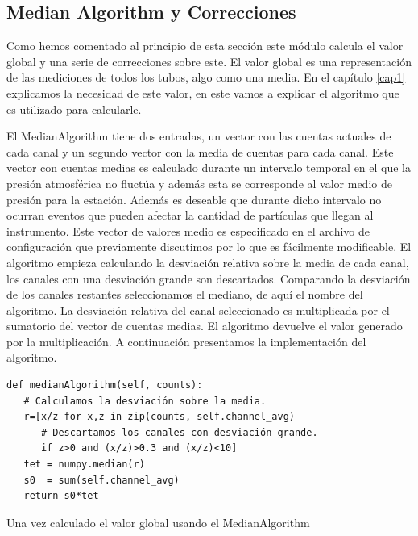         \subsection{Median Algorithm y Correcciones}
            Como hemos comentado al principio de esta sección este módulo
            calcula el valor global y una serie de correcciones sobre este. El
            valor global es una representación de las mediciones de todos los
            tubos, algo como una media. En el capítulo \ref{cap1} explicamos la
            necesidad de este valor, en este vamos a explicar el algoritmo que
            es utilizado para calcularle.
            \par 
            El MedianAlgorithm\cite{MedianAlgr} tiene dos entradas, un vector
            con las cuentas actuales de cada canal y un segundo vector con la
            media de cuentas para cada canal. Este vector con cuentas medias es
            calculado durante un intervalo temporal en el que la presión
            atmosférica no fluctúa y además esta se corresponde al valor medio
            de presión para la estación. Además es deseable que durante dicho
            intervalo no ocurran eventos que pueden afectar la cantidad de
            partículas que llegan al instrumento. Este vector de valores medio
            es especificado  en el archivo de configuración que previamente
            discutimos por lo que es fácilmente modificable. El algoritmo
            empieza calculando la desviación relativa sobre la media de cada
            canal, los canales con una desviación grande son descartados.
            Comparando la desviación de los canales restantes seleccionamos el
            mediano, de aquí el nombre del algoritmo. La desviación relativa
            del canal seleccionado es multiplicada por el sumatorio del vector
            de cuentas medias. El algoritmo devuelve el valor generado por la
            multiplicación. A continuación presentamos la implementación del
            algoritmo.
            \begin{lstlisting}[style=myPython]
def medianAlgorithm(self, counts):
   # Calculamos la desviación sobre la media.
   r=[x/z for x,z in zip(counts, self.channel_avg) 
      # Descartamos los canales con desviación grande.
      if z>0 and (x/z)>0.3 and (x/z)<10]
   tet = numpy.median(r)
   s0  = sum(self.channel_avg)
   return s0*tet
            \end{lstlisting}
            \par 
            Una vez calculado el valor global usando el MedianAlgorithm
